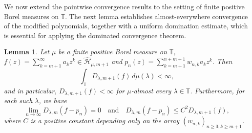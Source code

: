 \documentclass[12pt,reqno]{amsart}
\newtheorem{lemma}[theorem]{Lemma}
\begin{document}
We now extend the pointwise convergence results to the setting of finite positive
Borel measures on $\mathbb{T}$.
The next lemma establishes almost-everywhere convergence of the modified polynomials,
together with a uniform domination estimate, which is essential for applying the
dominated convergence theorem.

\begin{lemma}\label{lm4.8}
Let \( \mu \) be a finite positive Borel measure on \( \mathbb{T} \), \(  f(z)=\sum\limits_{k = m+1}^\infty  {{a_k}{z^k}} \in \widehat{\mathcal{H}}_{\mu, m+1} \) and \( p_n(z) = \sum\limits_{k = m+1}^{n + m + 1} w_{n,k} a_k z^k \). Then
\[
\int_{\mathbb{T}} D_{\lambda,m+1}(f) \, d\mu(\lambda) < \infty,
\]
and in particular, \( D_{\lambda,m+1}(f) < \infty \) for \( \mu \)-almost every \(\lambda \in \mathbb{T} \). Furthermore, for each such \( \lambda \), we have
\[
\lim_{n \to \infty} D_{\lambda,m}(f - p_n) = 0 \quad \text{and} \quad
D_{\lambda,m}(f - p_n) \le C^2 D_{\lambda,m+1}(f),
\]
where \( C \) is a positive constant depending only on the array \( (w_{n,k})_{n \geq 0, k \geq m+1} \).
\end{lemma}
\end{document}
